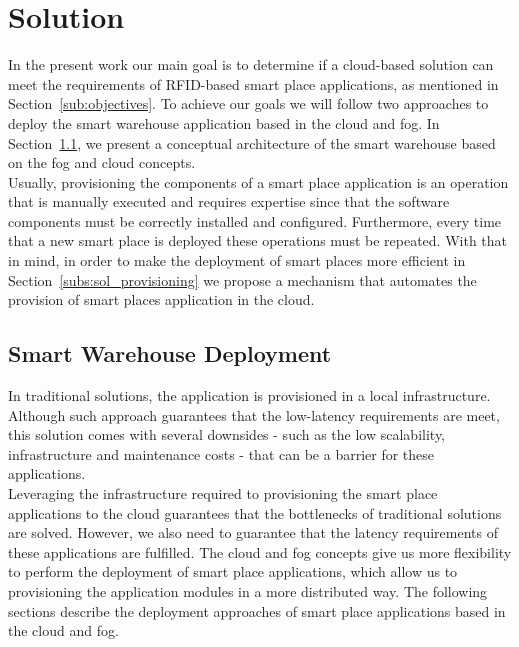 
\section{Solution}
\label{sec:solution}

In the present work our main goal is to determine if a cloud-based solution can meet the
requirements of RFID-based smart place applications, as mentioned in Section~\ref{sub:objectives}.
To achieve our goals we will follow two approaches to deploy the smart warehouse application based
in the cloud and fog. In Section~\ref{sub:sol_smart_warehouse_deployment}, we present a
conceptual architecture of the smart warehouse based on the fog and cloud concepts.\\

Usually, provisioning the components of a smart place application is an operation that is manually executed and
requires expertise since that the software components must be correctly installed and configured.
Furthermore, every time that a new smart place is deployed these operations must be repeated. With
that in mind, in order to make the deployment of smart places more efficient in Section~\ref{subs:sol_provisioning}
we propose a mechanism that automates the provision of smart places application in the cloud.\\

\subsection{Smart Warehouse Deployment}
\label{sub:sol_smart_warehouse_deployment}
In traditional solutions, the application is provisioned in a local infrastructure. Although such
approach guarantees that the low-latency requirements are meet, this solution comes with several
downsides - such as the low scalability, infrastructure and maintenance costs - that can be a
barrier for these applications.\\

Leveraging the infrastructure required to provisioning the smart place applications to the cloud
guarantees that the bottlenecks of traditional solutions are solved. However, we also need to
guarantee that the latency requirements of these applications are fulfilled. The cloud and fog concepts
give us more flexibility to perform the deployment of smart place applications, which allow us to
provisioning the application modules in a more distributed way. The following sections describe
the deployment approaches of smart place applications based in the cloud and fog.\\

